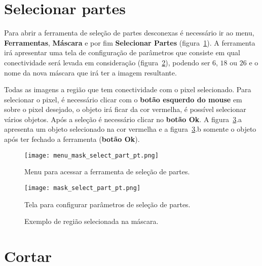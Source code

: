 \section{Selecionar partes}

Para abrir a ferramenta de seleção de partes desconexas é necessário ir ao menu, \textbf{Ferramentas}, \textbf{Máscara} e por fim \textbf{Selecionar Partes} (figura~\ref{fig:menu_mask_select_part}). A ferramenta irá apresentar uma tela de configuração de parâmetros que consiste em qual conectividade será levada em consideração (figura~\ref{fig:mask_select_part}), podendo ser $6$, $18$ ou $26$ e o nome da nova máscara que irá ter a imagem resultante.

Todas as imagens a região que tem conectividade com o pixel selecionado. Para selecionar o pixel, é necessário clicar com o \textbf{botão esquerdo do mouse} em sobre o pixel desejado, o objeto irá ficar da cor vermelha, é possível selecionar vários objetos. Após a seleção é necessário clicar no \textbf{botão Ok}. A figura~\ref{fig:mask_selected_part}.a apresenta um objeto selecionado na cor vermelha e a figura~\ref{fig:mask_selected_part}.b  somente o objeto após ter fechado a ferramenta (\textbf{botão Ok}).

\begin{figure}[!htb]
\centering
\texttt{[image: menu\_mask\_select\_part\_pt.png]}
\caption{Menu para acessar a ferramenta de seleção de partes.}
\label{fig:menu_mask_select_part}
\end{figure}

\begin{figure}[!htb]
\centering
\texttt{[image: mask\_select\_part\_pt.png]}
\caption{Tela para configurar parâmetros de seleção de partes.}
\label{fig:mask_select_part}
\end{figure}

\begin{figure}[!htb]
  \centering
    \qquad
  \hfill
  \caption{Exemplo de região selecionada na máscara.}
  \label{fig:mask_selected_part}
\end{figure}

\section{Cortar}

